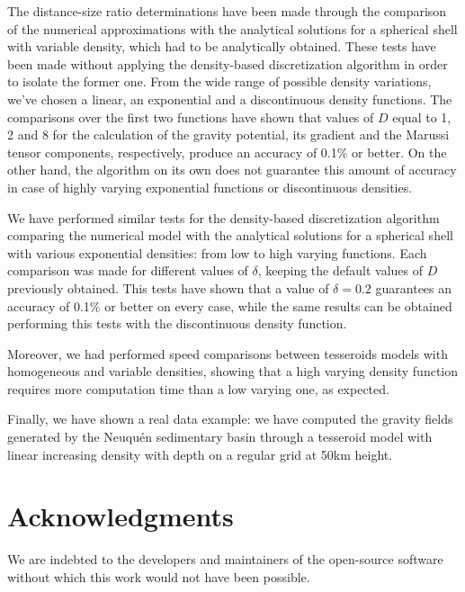 \documentclass[extra]{gji}
\begin{document}
The distance-size ratio determinations have been made through the comparison of the numerical approximations with the analytical solutions for a spherical shell with variable density, which had to be analytically obtained.
These tests have been made without applying the density-based discretization algorithm in order to isolate the former one.
From the wide range of possible density variations, we've chosen a linear, an exponential and a discontinuous density functions.
The comparisons over the first two functions have shown that values of $D$ equal to 1, 2 and 8 for the calculation of the gravity potential, its gradient and the Marussi tensor components, respectively, produce an accuracy of 0.1\% or better.
On the other hand, the algorithm on its own does not guarantee this amount of accuracy in case of highly varying exponential functions or discontinuous densities.

We have performed similar tests for the density-based discretization algorithm comparing the numerical model with the analytical solutions for a spherical shell with various exponential densities: from low to high varying functions.
Each comparison was made for different values of $\delta$, keeping the default values of $D$ previously obtained.
This tests have shown that a value of $\delta = 0.2$ guarantees an accuracy of 0.1\% or better on every case, while the same results can be obtained performing this tests with the discontinuous density function.

Moreover, we had performed speed comparisons between tesseroids models with homogeneous and variable densities, showing that a high varying density function requires more computation time than a low varying one, as expected.

Finally, we have shown a real data example: we have computed the gravity fields generated by the Neuqu\'en sedimentary basin through a tesseroid model with linear increasing density with depth on a regular grid at 50km height.



\section{Acknowledgments}

We are indebted to the developers and maintainers of the open-source
software without which this work would not have been possible.




\end{document}
